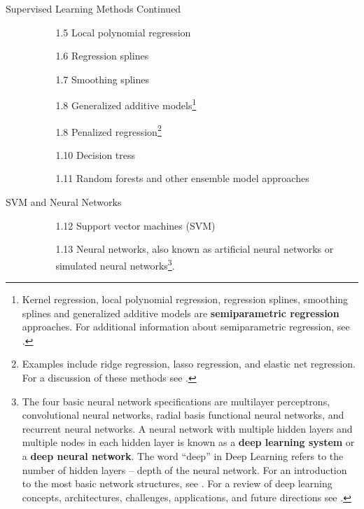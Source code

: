 \documentclass[pdf]{beamer}
\newcommand{\empr}[1]{{\color{franklinblue}\textbf{#1}}}
\theoremstyle{remark}
\theoremstyle{definition}
\begin{document}
\begin{frame}[t]{Supervised Learning Methods Continued}
\begin{enumerate}
\item []
\begin{itemize}
\item []
\begin{enumerate}
\item [1.5] Local polynomial regression
\item [1.6] Regression splines
\item [1.7]  Smoothing splines 
\item [1.8] Generalized additive models\footnote{Kernel regression, local polynomial regression, regression splines, smoothing splines and generalized additive models are \empr{semiparametric regression} approaches.  For additional information about semiparametric regression, see \cite{rupert2009}.} 
\item [1.8] Penalized regression\footnote{Examples include ridge regression, lasso regression, and elastic net regression.  For a discussion of these methods see \cite{zou2005}.}
\item [1.10] Decision tress
\item [1.11] Random forests and other ensemble model approaches
\end{enumerate}
\end{itemize}
\end{enumerate}
\end{frame}

\begin{frame}[t]{SVM and Neural Networks}
\begin{enumerate}
\item []
\begin{itemize}
\item []
\begin{enumerate}
\item [1.12] Support vector machines (SVM)
\item [1.13] Neural networks, also known as artificial neural networks or simulated neural networks\footnote{The four basic neural network specifications are multilayer perceptrons, convolutional neural networks, radial basis functional neural networks, and recurrent neural networks.  A neural network with multiple hidden layers and multiple nodes in each hidden layer is known as a \empr{deep learning system} or a \empr{deep neural network}.  The word ``deep'' in Deep Learning refers to the number of hidden layers -- depth of the neural network.  For an introduction to the most basic network structures, see \cite{james2021}. For a review of deep learning concepts,  architectures, challenges, applications, and future directions see \cite{alzubaidi2021beamerissue}.}. 
\end{enumerate}
\end{itemize}
\end{enumerate}
\end{frame}
\end{document}

